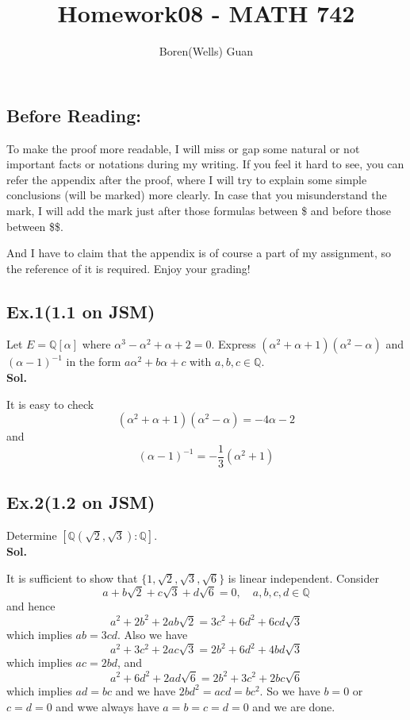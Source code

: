\documentclass[lang=en,11pt,a4paper,citestyle =authoryear]{elegantpaper}
\title{Homework08 - MATH 742}
\author{Boren(Wells) Guan}
\begin{document}
\maketitle

\subsection*{Before Reading:}\par
To make the proof more readable, I will miss or gap some natural or not important facts or notations during my writing. If you feel it hard to see, you can refer the appendix after the proof, where I will try to explain some simple conclusions (will be marked) more clearly. In case that you misunderstand the mark, I will add the mark just after those formulas between \$ and before those between \$\$.\par
And I have to claim that the appendix is of course a part of my assignment, so the reference of it is required. Enjoy your grading!

\subsection*{Ex.1(1.1 on JSM)} 
Let $E = \mathbb{Q}[\alpha]$ where  $\alpha^3 - \alpha^2 + \alpha + 2 = 0$. Express $(\alpha^2+\alpha+1)(\alpha^2 - \alpha)$ and $(\alpha-1)^{-1}$ in the form $a\alpha^2 + b\alpha + c$ with $a,b,c\in\mathbb{Q}$.
\vspace{0.5em}\\
\textbf{Sol.} \par
    It is easy to check 
    \[
    (\alpha^2+\alpha+1)(\alpha^2 - \alpha) = - 4\alpha -2
    \]
    and
    \[
    (\alpha - 1)^{-1} = -\dfrac{1}{3}(\alpha^2 + 1)
    \]
\par 
\vspace{0.5em}

\subsection*{Ex.2(1.2 on JSM)} 
Determine $[\mathbb{Q}(\sqrt{2},\sqrt{3}):\mathbb{Q}]$.
\vspace{0.5em}\\
\textbf{Sol.} \par
It is sufficient to show that $\{1,\sqrt{2},\sqrt{3},\sqrt{6}\}$ is linear independent. Consider
\[
a + b\sqrt{2}+c\sqrt{3}+d\sqrt{6} = 0,\quad a,b,c,d\in\mathbb{Q}
\]
and hence
\[
a^2 + 2b^2 + 2ab\sqrt{2} = 3c^2 + 6d^2 + 6cd\sqrt{3}
\]
which implies $ab = 3cd$. Also we have
\[
a^2 + 3c^2 + 2ac\sqrt{3} = 2b^2 + 6d^2 + 4bd\sqrt{3}
\]
which implies $ac = 2bd$, and
\[
a^2 + 6d^2 + 2ad\sqrt{6} = 2b^2 + 3c^2 + 2bc\sqrt{6}
\]
which implies $ad = bc$ and we have $2bd^2= acd = bc^2$. So we have $b = 0$ or $c = d = 0$ and wwe always have $a=b=c=d=0$ and we are done.
\par 
\vspace{0.5em}
\end{document}

